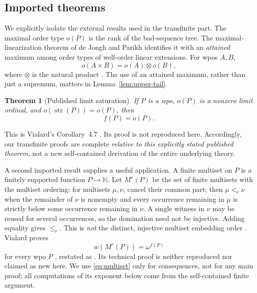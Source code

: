 \documentclass[11pt,letterpaper]{article}
\newtheorem{theorem}{Theorem}[section]
\theoremstyle{definition}
\theoremstyle{remark}
\newcommand{\str}{\operatorname{str}}
\newcommand{\N}{\mathbb{N}}
\begin{document}
\subsection{Imported theorems}
We explicitly isolate the external results used in the transfinite part.
The maximal order type $o(P)$ is the rank of the bad-sequence tree. The
maximal-linearization theorem of de Jongh and Parikh identifies it with an
\emph{attained} maximum among order types of well-order linear extensions.
For wpos $A,B$,
\begin{equation}\label{eq:mot-product}
 o(A\times B)=o(A)\otimes o(B),
\end{equation}
where $\otimes$ is the natural product \cite{DeJonghParikh}.
The use of an attained maximum, rather than just a supremum, matters in
Lemma~\ref{lem:upper-tail}.

\begin{theorem}[Published limit saturation]\label{thm:imported-limit}
If $P$ is a wpo, $o(P)$ is a nonzero limit ordinal, and
$o(\str(P))=o(P)$, then
\[
 f(P)=o(P).
\]
\end{theorem}
This is Vialard's Corollary~4.7 \cite{Vialard2023}. Its proof is not
reproduced here. Accordingly, our transfinite proofs are complete
\emph{relative to this explicitly stated published theorem}, not a new
self-contained derivation of the entire underlying theory.

A second imported result supplies a useful application. A finite multiset on
$P$ is a finitely supported function $P\to\N$. Let $M^r(P)$ be the set of
finite multisets with the multiset ordering: for multisets $\mu,\nu$, cancel
their common part; then $\mu<_r\nu$ when the remainder of $\nu$ is nonempty
and every occurrence remaining in $\mu$ is strictly below some occurrence
remaining in $\nu$. A single witness in $\nu$ may be reused for several
occurrences, so the domination need not be injective. Adding equality gives
$\le_r$. This is \emph{not} the distinct, injective multiset embedding order
\cite[Section~1]{Vialard2023}. Vialard proves
\begin{equation}\label{eq:multiset}
 w(M^r(P))=\omega^{f(P)}
\end{equation}
for every wpo $P$
\cite[Theorem~3.4]{Vialard2023}, restated as
\cite[Definition~5.3.2, Theorem~5.3.3]{VialardThesis}. Its technical proof
is neither reproduced nor claimed as new here. We use \eqref{eq:multiset}
only for consequences, not for any main proof; all computations of its
exponent below come from the self-contained finite argument.
\end{document}
